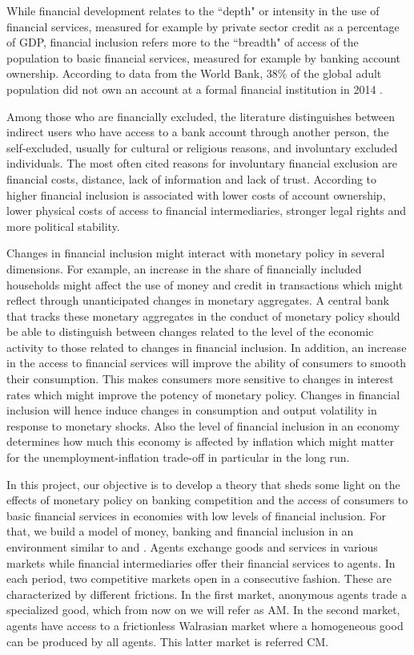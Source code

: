 \documentclass[12pt,a4paper,titlepage]{article}
\begin{document}
While financial development relates to the ``depth" or intensity in the use of financial services, measured for example by private sector credit as a percentage of GDP, financial inclusion refers more to the ``breadth" of access of the population to basic financial services, measured for example by banking account ownership. According to data from the World Bank, 38\% of the global adult population did not own an account at a formal financial institution in 2014 \citep{Demirguec-Kunt2015}.

Among those who are financially excluded, the literature distinguishes between indirect users who have access to a bank account through another person, the self-excluded, usually for cultural or religious reasons, and involuntary excluded individuals. The most often cited reasons for involuntary financial exclusion are financial costs, distance, lack of information and lack of trust. According to \cite{Allen2016} higher financial inclusion is associated with lower costs of account ownership, lower physical costs of access to financial intermediaries, stronger legal rights and more political stability.

Changes in financial inclusion might interact with monetary policy in several dimensions. For example, an increase in the share of financially included households might affect the use of money and credit in transactions which might reflect through unanticipated changes in monetary aggregates. A central bank that tracks these monetary aggregates in the conduct of monetary policy should be able to distinguish between changes related to the level of the economic activity to those related to changes in financial inclusion. In addition, an increase in the access to financial services will improve the ability of consumers to smooth their consumption. This makes consumers more sensitive to changes in interest rates which might improve the potency of monetary policy. Changes in financial inclusion will hence induce changes in consumption and output volatility in response to monetary shocks. Also the level of financial inclusion in an economy determines how much this economy is affected by inflation which might matter for the unemployment-inflation trade-off in particular in the long run.

In this project, our objective is to develop a theory that sheds some light on the effects of monetary policy on banking competition and the access of consumers to basic financial services in economies with low levels of financial inclusion. For that, we build a model of money, banking and financial inclusion in an environment similar to \cite{Lagos2005} and \cite{Berentsen2007}. Agents exchange goods and services in various markets while financial intermediaries offer their financial services to agents. In each period, two competitive markets open in a consecutive fashion. These are characterized by different frictions. In the first market, anonymous agents trade a specialized good, which from now on we will refer as AM. In the second market, agents have access to a frictionless Walrasian market where a homogeneous good can be produced by all agents. This latter market is referred CM.
\end{document}
